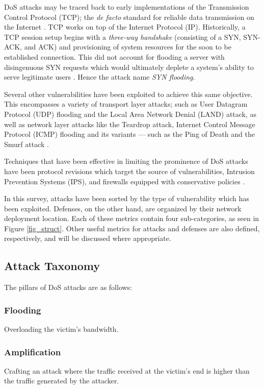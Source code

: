 \documentclass[conference]{IEEEtran}
\begin{document}
DoS attacks may be traced back to early implementations of the Transmission Control Protocol (TCP); the \textit{de facto} standard for reliable data transmission on the Internet \cite{DoSTCPAnalysis:Schuba}. TCP works on top of the Internet Protocol (IP). Historically, a TCP session setup begins with a \textit{three-way handshake} (consisting of a SYN, SYN-ACK, and ACK) and provisioning of system resources for the soon to be established connection. This did not account for flooding a server with disingenuous SYN requests which would ultimately deplete a system's ability to serve legitimate users \cite{DoSTCPAnalysis:Schuba}. Hence the attack name \textit{SYN flooding}.

Several other vulnerabilities have been exploited to achieve this same objective. This encompasses a variety of transport layer attacks; such as User Datagram Protocol (UDP) flooding and the Local Area Network Denial (LAND) attack, as well as network layer attacks like the Teardrop attack, Internet Control Message Protocol (ICMP) flooding and its variants --- such as the Ping of Death and the Smurf attack \cite{SecuringCloudServers:Chapade,Yan:SDNSurvey}.

Techniques that have been effective in limiting the prominence of DoS attacks have been protocol revisions which target the source of vulnerabilities, Intrusion Prevention Systems (IPS), and firewalls equipped with conservative policies \cite{DoSTCPAnalysis:Schuba}.

In this survey, attacks have been sorted by the type of vulnerability which has been exploited. Defenses, on the other hand, are organized by their network deployment location. Each of these metrics contain four sub-categories, as seen in Figure \ref{fig_struct}. Other useful metrics for attacks and defenses are also defined, respectively, and will be discussed where appropriate.

\subsection{Attack Taxonomy}
The pillars of DoS attacks are as follows: 
\subsubsection{Flooding}
Overloading the victim's bandwidth.
\subsubsection{Amplification}
Crafting an attack where the traffic received at the victim's end is higher than the traffic generated by the attacker.
\end{document}
